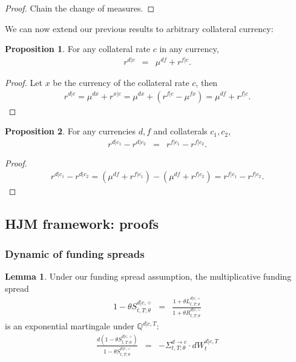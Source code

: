 \documentclass[11pt,english]{amsart}
\newcommand{\QQ}{\mathbb{Q}}
\theoremstyle{definition}
\newtheorem{prop}{Proposition}
\newtheorem{lemm}{Lemma}
\begin{document}
\begin{proof}
Chain the change of measures.
\end{proof}


We can now extend our previous results to arbitrary collateral currency:
\begin{prop}
For any collateral rate $c$ in any currency,
\begin{eqnarray*}
	r^{d|c} &=& \mu^{df} + r^{f|c}.
\end{eqnarray*} 
\end{prop}


\begin{proof}
Let $x$ be the currency of the collateral rate $c$, then
\begin{eqnarray*}
	r^{d|c}  = \mu^{dx} + r^{x|c} = \mu^{dx} + (r^{f|c} - \mu^{fx}) = \mu^{df} + r^{f|c}.
\end{eqnarray*} 
\end{proof}

\begin{prop}
For any currencies $d,f$ and collaterals $c_1,c_2$,
\begin{eqnarray*}
	r^{d|c_1} - r^{d|c_2} &=& r^{f|c_1} - r^{f|c_2}.
\end{eqnarray*} 
\end{prop}

\begin{proof}
\begin{eqnarray*}
	r^{d|c_1} - r^{d|c_2} = (\mu^{df} + r^{f|c_1} ) - (\mu^{df} + r^{f|c_2} ) =  r^{f|c_1} - r^{f|c_2}.
\end{eqnarray*} 
\end{proof}


\subsection{HJM framework: proofs}%

\subsubsection{Dynamic of funding spreads}

\begin{lemm}
Under our funding spread assumption, the multiplicative funding spread
\begin{eqnarray}
	1 - \theta S^{d|c,\div}_{t,T;\theta}
	&=&  \frac{1+\theta L^{d|c,\div}_{t,T;\theta}}{1+\theta R^{d|c,\div}_{t,T;\theta}} 
\end{eqnarray} 
is an exponential martingale under $\QQ^{d|c,T}$:
\begin{eqnarray}
  \frac{d(1 - \theta S^{d|c,\div}_{t,T;\theta})}{1 - \theta S^{d|c,\div}_{t,T;\theta}} 	
  &=& -\Sigma^{d\to c}_{t,T;\theta} \cdot dW^{d|c,T}_t 
\end{eqnarray} 
\end{lemm}
\end{document}
